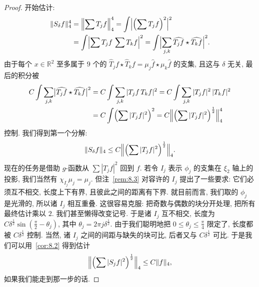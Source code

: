 \begin{proof}
开始估计:
\begin{align*}
\|S_{\delta}f\|_{4}^{4}
&=\Bigl\|\sum T_{j}f\Bigr\|_{4}^{4}
=\int\Bigl|\Bigl(\sum T_{j}f\Bigr)^{2}\Bigr|^{2} \\
&=\int\Bigl|\sum T_{j}f\,\sum T_{k}f\Bigr|^{2}
=\int\Bigl|\sum_{j,k}\widehat{T_{j}f}\star\widehat{T_{k}f}\Bigr|^{2}.
\end{align*}
由于每个 $x\in\mathbb{R}^2$ 至多属于 $9$ 个的 $\widehat{T}_jf\star\widehat{T}_kf=\mu_j\hat{f}\star\mu_k\hat{f}$ 的支集, 且这与 $\delta$ 无关, 最后的积分被
\begin{align*}
C\int\sum_{j,k}\bigl|\widehat{T_{j} f}\star\widehat{T_{k} f}\bigr|^{2}
&=C\int\sum_{j,k}|T_{j}f\,T_{k}f|^{2}
=C\int\sum_{j,k}|T_{j}f|^{2}\,|T_{k}f|^{2} \\
&=C\int\Bigl(\sum|T_{j}f|^{2}\Bigr)^{2}
=C\Bigl\|\Bigl(\sum|T_{j}f|^{2}\Bigr)^{\frac{1}{2}}\Bigr\|_{4}^{4}
\end{align*}
控制. 我们得到第一个分解:
\[
\|S_{\delta}f\|_{4}\leq C\Bigl\|\Bigl(\sum|T_{j}f|^{2}\Bigr)^{\frac{1}{2}}\Bigr\|_{4}.
\]
现在的任务是借助 $g$-函数从 $\sum|T_jf|^2$ 回到 $f$. 若令 $I_j$ 表示 $\phi_j$ 的支集在 $\xi_2$ 轴上的投影, 我们当然有 $\chi_{I_j}\mu_j=\mu_j$. 但注~\ref{rem:8.3} 对容许的 $I_j$ 提出了一些要求: 它们必须互不相交, 长度上下有界, 且彼此之间的距离有下界. 就目前而言, 我们取的 $\phi_j$ 是光滑的, 所以诸 $I_j$ 相互重叠. 这很容易克服: 把奇数与偶数的块分开处理, 把所有最终估计乘以 $2$. 我们甚至懒得改变记号. 于是诸 $I_j$ 互不相交, 长度为 $C\delta^{\frac{1}{2}}\sin(\frac{\pi}{2}-\theta_j)$, 其中 $\theta_j=2\pi j\delta^{\frac{1}{2}}$. 由于我们聪明地把 $0\leq\theta_j\leq\frac{\pi}{4}$ 限定了, 长度都被 $C\delta^{\frac{1}{2}}$ 控制. 当然, 诸 $I_j$ 之间的间距与缺失的块可比, 后者又与 $C\delta^{\frac{1}{2}}$ 可比. 于是我们可以用~\ref*{cor:8.2} 得到估计
\[
\Bigl\|\Bigl(\sum|S_{j}f|^{2}\Bigr)^{\frac{1}{2}}\Bigr\|_{4}\leq C\|f\|_{4},
\]
如果我们能走到那一步的话.


\end{proof}
